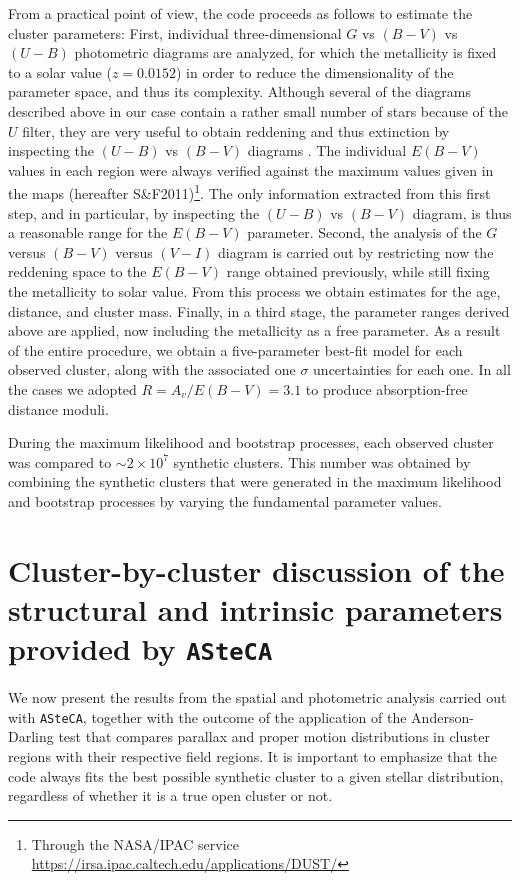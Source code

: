 \documentclass[draft]{aa}
\begin{document}
From a practical point of view, the code proceeds as follows to estimate the
cluster parameters: First, individual three-dimensional $G$ vs $(B-V)$ vs $
(U-B)$ photometric diagrams are analyzed, for which the metallicity is fixed to
a solar value ($z = 0.0152$) in order to reduce the dimensionality of the
parameter space, and thus its complexity. Although several of the diagrams
described above in our case contain a rather small number of stars because of
the $U$ filter, they are very useful to obtain reddening and thus
extinction by inspecting the $(U-B)$ vs $(B-V)$ diagrams
\citep[e.g.,][]{Vazquez2008} .
%
The individual $E(B-V)$ values in each region were always verified against
the maximum values given in the \cite{Schlafly_2011} maps (hereafter
S\&F2011)\footnote{Through the
NASA/IPAC service \url{https://irsa.ipac.caltech.edu/applications/DUST/}}.
The only information extracted from this first step, and in particular,
by inspecting the $(U-B)$ vs $(B-V)$ diagram, is thus a reasonable range for
the $E(B-V)$ parameter.
%
Second, the analysis of the $G$ versus $(B-V)$ versus $(V-I)$ diagram is carried out
by restricting now the reddening space to the $E(B-V)$ range obtained previously,
while still fixing the metallicity to solar value. From this process we obtain
estimates for the age, distance, and cluster mass.
%
Finally, in a third stage, the parameter ranges derived above are applied, now
including the metallicity as a free parameter.
As a result of the entire procedure, we obtain a five-parameter best-fit model
for each observed cluster, along with the associated one $\sigma$ uncertainties
for each one. In all the cases we adopted $R=A_v/E(B-V) = 3.1$ to produce 
absorption-free distance moduli.

During the maximum likelihood and bootstrap processes,
each observed cluster was compared to $\sim2\times10^7$
synthetic clusters. This number was obtained by combining the synthetic
clusters that were generated in the maximum likelihood and bootstrap processes by
varying the fundamental parameter values.




\section{Cluster-by-cluster discussion of the structural and intrinsic parameters
provided by \texttt{ASteCA}}
\label{sec:cluster_discuss}

We now present the results from the spatial and photometric analysis
carried out with \texttt{ASteCA}, together with the outcome of the application
of the Anderson-Darling test that compares parallax and proper motion
distributions in cluster regions with their respective field regions.
It is important to emphasize that the code always fits the
best possible synthetic cluster to a given stellar distribution, regardless of 
whether it is a true open cluster or not.
\end{document}
